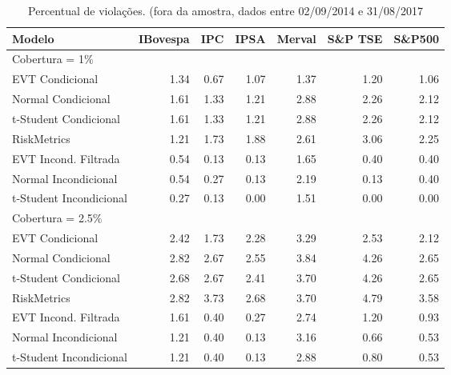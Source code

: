 \begin{table}[H]
\centering
\caption{Percentual de violações. (fora da amostra, dados entre 02/09/2014 e 31/08/2017} 
\label{tab:varviol}
\begin{tabular}{lrrrrrr}
  \hline
Modelo & IBovespa & IPC & IPSA & Merval & S\&P TSE & S\&P500 \\ 
  \hline
Cobertura = 1\% &  &  &  &  &  &  \\ 
  EVT Condicional & 1.34 & 0.67 & 1.07 & 1.37 & 1.20 & 1.06 \\ 
  Normal Condicional & 1.61 & 1.33 & 1.21 & 2.88 & 2.26 & 2.12 \\ 
  t-Student Condicional & 1.61 & 1.33 & 1.21 & 2.88 & 2.26 & 2.12 \\ 
  RiskMetrics & 1.21 & 1.73 & 1.88 & 2.61 & 3.06 & 2.25 \\ 
  EVT Incond. Filtrada & 0.54 & 0.13 & 0.13 & 1.65 & 0.40 & 0.40 \\ 
  Normal Incondicional & 0.54 & 0.27 & 0.13 & 2.19 & 0.13 & 0.40 \\ 
  t-Student Incondicional & 0.27 & 0.13 & 0.00 & 1.51 & 0.00 & 0.00 \\ 
  Cobertura = 2.5\% &  &  &  &  &  &  \\ 
  EVT Condicional & 2.42 & 1.73 & 2.28 & 3.29 & 2.53 & 2.12 \\ 
  Normal Condicional & 2.82 & 2.67 & 2.55 & 3.84 & 4.26 & 2.65 \\ 
  t-Student Condicional & 2.68 & 2.67 & 2.41 & 3.70 & 4.26 & 2.65 \\ 
  RiskMetrics & 2.82 & 3.73 & 2.68 & 3.70 & 4.79 & 3.58 \\ 
  EVT Incond. Filtrada & 1.61 & 0.40 & 0.27 & 2.74 & 1.20 & 0.93 \\ 
  Normal Incondicional & 1.21 & 0.40 & 0.13 & 3.16 & 0.66 & 0.53 \\ 
  t-Student Incondicional & 1.21 & 0.40 & 0.13 & 2.88 & 0.80 & 0.53 \\ 
   \hline
\end{tabular}
\end{table}
